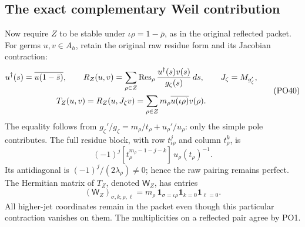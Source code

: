 \subsection{The exact complementary Weil contribution}

Now require \(Z\) to be stable under
\(\iota\rho=1-\bar\rho\), as in the original reflected packet.
For germs \(u,v\in A_h\), retain the original raw residue form
and its Jacobian contraction:
\[
 \begin{gathered}
 u^\dagger(s)=\overline{u(1-\bar s)},\qquad
 R_Z(u,v)=\sum_{\rho\in Z}
       \operatorname{Res}_\rho\frac{u^\dagger(s)v(s)}{g_\zeta(s)}\,ds,\qquad
 J_\zeta=M_{g_\zeta'},\\
 T_Z(u,v)=R_Z(u,J_\zeta v)
       =\sum_{\rho\in Z}m_\rho
                  \overline{u(\iota\rho)}v(\rho).
 \end{gathered}
 \tag{PO40}\label{PO:po:trace}
\]
The equality follows from
\(g_\zeta'/g_\zeta=m_\rho/t_\rho+u_\rho'/u_\rho\):
only the simple pole contributes.
The full residue block, with row \(t_{\iota\rho}^j\) and
column \(t_\rho^k\), is
\[
 (-1)^j[t_\rho^{m_\rho-1-j-k}]\,u_\rho(t_\rho)^{-1}.
 \tag{PO41}\label{PO:po:raw-matrix}
\]
Its antidiagonal is \((-1)^j/(2\lambda_\rho)\ne0\);
hence the raw pairing remains perfect. The Hermitian matrix
of \(T_Z\), denoted \(\mathsf W_Z\), has entries
\[
 (\mathsf W_Z)_{\sigma,k;\rho,\ell}
     =m_\rho\,\mathbf1_{\sigma=\iota\rho}
                \mathbf1_{k=0}\mathbf1_{\ell=0}.
 \tag{PO42}\label{PO:po:WZ}
\]
All higher-jet coordinates remain in the packet even though
this particular contraction vanishes on them. The multiplicities
on a reflected pair agree by PO1.

